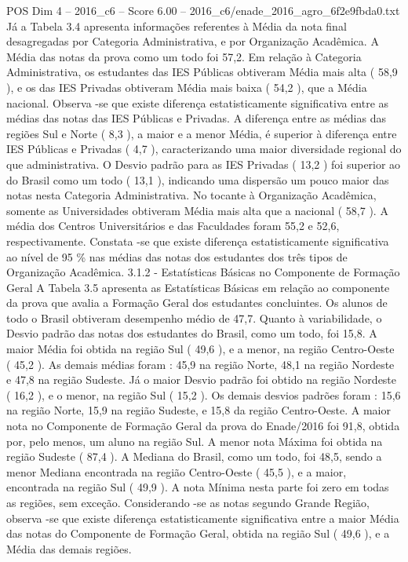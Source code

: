 \begin{textsample}{POS Dim 4 – 2016\_c6 – Score 6.00 – 2016\_c6/enade\_2016\_agro\_6f2e9fbda0.txt}
Já a Tabela 3.4 apresenta informações referentes à Média da nota final desagregadas por Categoria Administrativa, e por Organização Acadêmica.
A Média das notas da prova como um todo foi 57,2.
Em relação à Categoria Administrativa, os estudantes das IES Públicas obtiveram Média mais alta ( 58,9 ), e os das IES Privadas obtiveram Média mais baixa ( 54,2 ), que a Média nacional.
Observa -se que existe diferença estatisticamente significativa entre as médias das notas das IES Públicas e Privadas.
A diferença entre as médias das regiões Sul e Norte ( 8,3 ), a maior e a menor Média, é superior à diferença entre IES Públicas e Privadas ( 4,7 ), caracterizando uma maior diversidade regional do que administrativa.
O Desvio padrão para as IES Privadas ( 13,2 ) foi superior ao do Brasil como um todo ( 13,1 ), indicando uma dispersão um pouco maior das notas nesta Categoria Administrativa.
No tocante à Organização Acadêmica, somente as Universidades obtiveram Média mais alta que a nacional ( 58,7 ).
A média dos Centros Universitários e das Faculdades foram 55,2 e 52,6, respectivamente.
Constata -se que existe diferença estatisticamente significativa ao nível de 95 \% nas médias das notas dos estudantes dos três tipos de Organização Acadêmica. 3.1.2 - Estatísticas Básicas no Componente de Formação Geral A Tabela 3.5 apresenta as Estatísticas Básicas em relação ao componente da prova que avalia a Formação Geral dos estudantes concluintes.
Os alunos de todo o Brasil obtiveram desempenho médio de 47,7.
Quanto à variabilidade, o Desvio padrão das notas dos estudantes do Brasil, como um todo, foi 15,8.
A maior Média foi obtida na região Sul ( 49,6 ), e a menor, na região Centro-Oeste ( 45,2 ).
As demais médias foram : 45,9 na região Norte, 48,1 na região Nordeste e 47,8 na região Sudeste.
Já o maior Desvio padrão foi obtido na região Nordeste ( 16,2 ), e o menor, na região Sul ( 15,2 ).
Os demais desvios padrões foram : 15,6 na região Norte, 15,9 na região Sudeste, e 15,8 da região Centro-Oeste.
A maior nota no Componente de Formação Geral da prova do Enade/2016 foi 91,8, obtida por, pelo menos, um aluno na região Sul.
A menor nota Máxima foi obtida na região Sudeste ( 87,4 ).
A Mediana do Brasil, como um todo, foi 48,5, sendo a menor Mediana encontrada na região Centro-Oeste ( 45,5 ), e a maior, encontrada na região Sul ( 49,9 ).
A nota Mínima nesta parte foi zero em todas as regiões, sem exceção.
Considerando -se as notas segundo Grande Região, observa -se que existe diferença estatisticamente significativa entre a maior Média das notas do Componente de Formação Geral, obtida na região Sul ( 49,6 ), e a Média das demais regiões.

\end{textsample}
